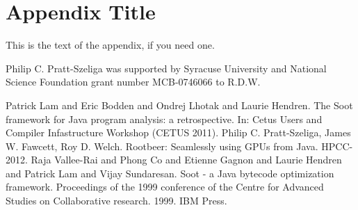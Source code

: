 \documentclass[preprint]{sigplanconf}
\begin{document}
\appendix
\section{Appendix Title}

This is the text of the appendix, if you need one.

\acks

Philip C. Pratt-Szeliga was supported by Syracuse University and National Science Foundation grant number MCB-0746066 to R.D.W.





\begin{thebibliography}{}
\softraggedright

 Patrick Lam and Eric Bodden and Ondrej Lhotak and Laurie Hendren. The Soot framework for Java program analysis: a retrospective. In: Cetus Users and Compiler Infastructure Workshop (CETUS 2011).
 Philip C. Pratt-Szeliga, James W. Fawcett, Roy D. Welch. Rootbeer: Seamlessly using GPUs from Java. HPCC-2012.
 Raja Vallee-Rai and Phong Co and Etienne Gagnon and Laurie Hendren and Patrick Lam and Vijay Sundaresan. Soot - a Java bytecode optimization framework. Proceedings of the 1999 conference of the Centre for Advanced Studies on Collaborative research. 1999. IBM Press.

\end{thebibliography}
\end{document}

